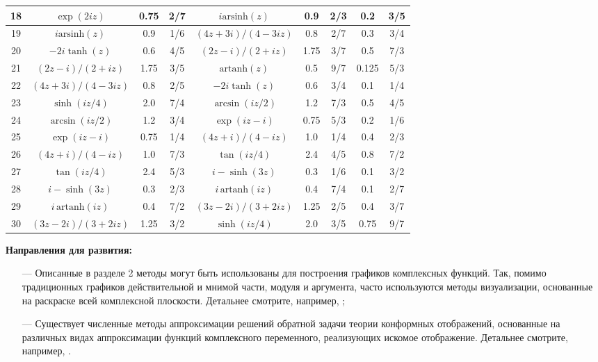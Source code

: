 \documentclass{article}
\theoremstyle{definition}
\begin{document}
\begin{longtable}[c]{|c||c|c|c||c|c|c|c|c|}
18 & $\exp(2iz)$ & 0.75 & 2/7 &     $i\textrm{arsinh}(z)$ & 0.9 & 2/3 & 0.2 & 3/5 \\ \hline
19 & $i\textrm{arsinh}(z)$ & 0.9 & 1/6 & $(4z+3i)/(4-3iz)$ & 0.8 & 2/7 & 0.3 & 3/4 \\ \hline
20 & $-2i\tanh(z)$ & 0.6 & 4/5 &   $(2z-i)/(2+iz)$      & 1.75 & 3/7 & 0.5 & 7/3 \\ \hline
21 & $(2z-i)/(2+iz)$ & 1.75 & 3/5 & $\textrm{artanh}(z)$ & 0.5 & 9/7 & 0.125 & 5/3 \\ \hline
22 & $(4z+3i)/(4-3iz)$ & 0.8 & 2/5 & $-2i\tanh(z)$      & 0.6 & 3/4 & 0.1 & 1/4 \\ \hline
23 & $\sinh(iz/4)$ & 2.0 & 7/4 &   $\arcsin(iz/2)$      & 1.2 & 7/3 & 0.5 & 4/5 \\ \hline
24 & $\arcsin(iz/2)$ & 1.2 & 3/4 & $\exp(iz- i)$        & 0.75 & 5/3 & 0.2 & 1/6 \\ \hline
25 & $\exp(iz- i)$ & 0.75 & 1/4 &  $(4z+i)/(4-iz)$      & 1.0 & 1/4 & 0.4 & 2/3 \\ \hline
26 & $(4z+i)/(4-iz)$ & 1.0 & 7/3 & $\tan(iz/4)$         & 2.4 & 4/5 & 0.8 & 7/2 \\ \hline
27 & $\tan(iz/4)$ & 2.4 & 5/3 &    $i - \sinh(3z)$      & 0.3 & 1/6 & 0.1 & 3/2 \\ \hline
28 & $i - \sinh(3z)$ & 0.3 & 2/3 & $i\,\textrm{artanh}(iz)$ & 0.4 & 7/4 & 0.1 & 2/7 \\ \hline
29 & $i\,\textrm{artanh}(iz)$ & 0.4 & 7/2 & $(3z-2i)/(3+2iz)$ & 1.25 & 2/5 & 0.4 & 3/7 \\ \hline
30 & $(3z-2i)/(3+2iz)$ & 1.25 & 3/2 & $\sinh(iz/4)$     & 2.0 & 3/5 & 0.75 & 9/7 \\ \hline
\end{longtable}
\vspace*{0.1cm} \noindent
\textbf{Направления для развития:}
\begin{itemize}
\item[---] Описанные в разделе 2 методы могут быть использованы для построения графиков комплексных функций. Так, помимо традиционных графиков действительной и мнимой части, модуля и аргумента, часто используются методы визуализации, основанные на раскраске всей комплексной плоскости. Детальнее смотрите, например, \cite{Eng}\cite{online};
\item[---] Существует численные методы аппроксимации решений обратной задачи теории конформных отображений, основанные на различных видах аппроксимации функций комплексного переменного, реализующих искомое отображение. Детальнее смотрите, например, \cite{1}.
\end{itemize}
\end{document}
